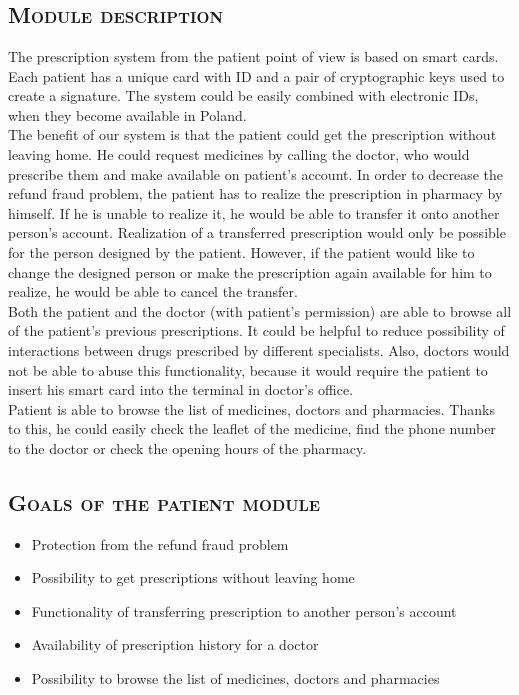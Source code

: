 \newpage

\chapter {}
\section{\textsc{Module description}}
The prescription system from the patient point of view is based on smart cards. 
Each patient has a unique card with ID and a pair of cryptographic keys used to create a signature. 
The system could be easily combined with electronic IDs, when they become available in Poland.
\\

The benefit of our system is that the patient could get the prescription without leaving home. 
He could request medicines by calling the doctor, who would prescribe them and make available on patient's account. 
In order to decrease the refund fraud problem, the patient has to realize the prescription in pharmacy by himself. 
If he is unable to realize it, he would be able to transfer it onto another person's account. 
Realization of a transferred prescription would only be possible for the person designed by the patient. 
However, if the patient would like to change the designed person or make the prescription again available for him to realize, he would be able to cancel the transfer.
\\

Both the patient and the doctor (with patient's permission) are able to browse all of the patient's previous prescriptions. 
It could be helpful to reduce possibility of interactions between drugs prescribed by different specialists. 
Also, doctors would not be able to abuse this functionality, because it would require the patient to insert his smart card into the terminal in doctor's office.
\\

Patient is able to browse the list of medicines, doctors and pharmacies. 
Thanks to this, he could easily check the leaflet of the medicine, find the phone number to the doctor or check the opening hours of the pharmacy.

\section{\textsc{Goals of the patient module}}
\begin{itemize}
\item Protection from the refund fraud problem
\item Possibility to get prescriptions without leaving home
\item Functionality of transferring prescription to another person's account
\item Availability of prescription history for a doctor
\item Possibility to browse the list of medicines, doctors and pharmacies
\end{itemize}

